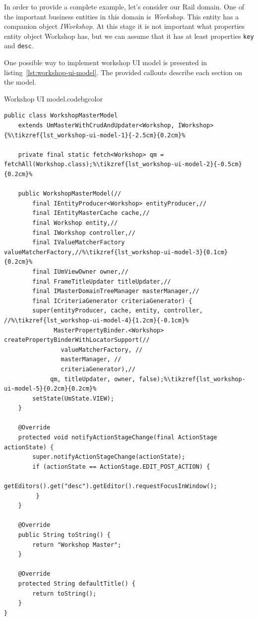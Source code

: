   In order to provide a complete example, let's consider our Rail domain.
  One of the important business entities in this domain is \emph{Workshop}.
  This entity has a companion object \emph{IWorkshop}.
  At this stage it is not important what properties entity object Workshop has, but we can assume that it has at least properties \texttt{key} and \texttt{desc}.
  
  One possible way to implement workshop UI model is presented in listing~\ref{lst:workshop-ui-model}.
  The provided callouts describe each section on the model.
  
  
  \begin{code}{Workshop UI model.}{\label{lst:workshop-ui-model}}{codebgcolor}
    \begin{lstlisting}
public class WorkshopMasterModel 
    extends UmMasterWithCrudAndUpdater<Workshop, IWorkshop> {%\tikzref{lst_workshop-ui-model-1}{-2.5cm}{0.2cm}%

    private final static fetch<Workshop> qm = fetchAll(Workshop.class);%\tikzref{lst_workshop-ui-model-2}{-0.5cm}{0.2cm}%
    
    public WorkshopMasterModel(//
    	final IEntityProducer<Workshop> entityProducer,//
    	final IEntityMasterCache cache,//
    	final Workshop entity,//
    	final IWorkshop controller,//
    	final IValueMatcherFactory valueMatcherFactory,//%\tikzref{lst_workshop-ui-model-3}{0.1cm}{0.2cm}%
    	final IUmViewOwner owner,//
    	final FrameTitleUpdater titleUpdater,//
    	final IMasterDomainTreeManager masterManager,//
    	final ICriteriaGenerator criteriaGenerator) {
        super(entityProducer, cache, entity, controller, //%\tikzref{lst_workshop-ui-model-4}{1.2cm}{-0.1cm}%
              MasterPropertyBinder.<Workshop> createPropertyBinderWithLocatorSupport(//
     			valueMatcherFactory, //
     			masterManager, //
     			criteriaGenerator),//
     	     qm, titleUpdater, owner, false);%\tikzref{lst_workshop-ui-model-5}{0.2cm}{0.2cm}%
        setState(UmState.VIEW);
    }
     
    @Override
    protected void notifyActionStageChange(final ActionStage actionState) {
        super.notifyActionStageChange(actionState);
        if (actionState == ActionStage.EDIT_POST_ACTION) {            
            getEditors().get("desc").getEditor().requestFocusInWindow();
         }
    }
     
    @Override
    public String toString() {
        return "Workshop Master";
    }
     
    @Override
    protected String defaultTitle() {
        return toString();
    }
}
    \end{lstlisting}
  \end{code}
